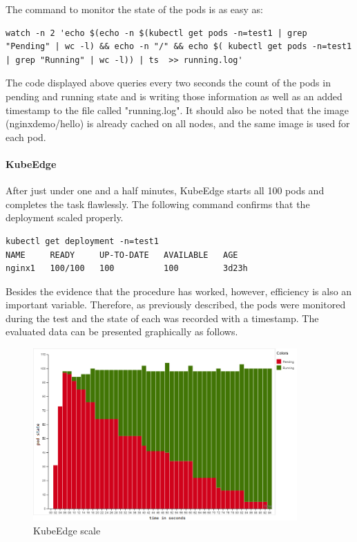\documentclass[MSC,Master,english]{twbook}%
\begin{document}
The command to monitor the state of the pods is as easy as:

\vspace{\baselineskip}
\begin{minipage}{\linewidth}
\begin{lstlisting}[caption={Pods status},captionpos=b]
watch -n 2 'echo $(echo -n $(kubectl get pods -n=test1 | grep "Pending" | wc -l) && echo -n "/" && echo $( kubectl get pods -n=test1 | grep "Running" | wc -l)) | ts  >> running.log'
\end{lstlisting}
\end{minipage}
\vspace{\baselineskip}

The code displayed above queries every two seconds the count of the pods in pending and running state and is writing those information as well as an added timestamp to the file called "running.log". It should also be noted that the image (nginxdemo/hello) is already cached on all nodes, and the same image is used for each pod.

\paragraph{KubeEdge} After just under one and a half minutes, KubeEdge starts all 100 pods and completes the task flawlessly. The following command confirms that the deployment scaled properly.
\vspace{\baselineskip}

\begin{lstlisting}[caption={KubeEdge scaling proof},captionpos=b]
kubectl get deployment -n=test1
NAME     READY     UP-TO-DATE   AVAILABLE   AGE
nginx1   100/100   100          100         3d23h
\end{lstlisting}

Besides the evidence that the procedure has worked, however, efficiency is also an important variable. Therefore, as previously described, the pods were monitored during the test and the state of each was recorded with a timestamp. The evaluated data can be presented graphically as follows.

\begin{center}
\begin{figure}[ht]
    \centering
    \includegraphics[width=0.9\textwidth]{PICs/kubeedge-scale-100.png}
    \caption{KubeEdge scale}
    \label{fig:kubeedge-scale}
\end{figure}
\end{center}
\end{document}
